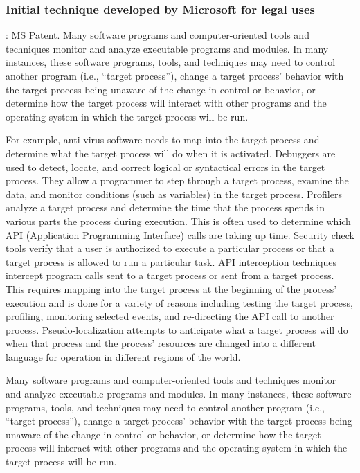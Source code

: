 \documentclass{article}
\begin{document}
\subsubsection{\textcite{Ghizzoni:2004} Initial technique developed by Microsoft for legal uses}
\textbf{}: MS Patent. Many software programs and computer-oriented tools and techniques monitor and analyze executable programs and modules. In many instances, these software programs, tools, and techniques may need to control another program (i.e., “target process”), change a target process' behavior with the target process being unaware of the change in control or behavior, or determine how the target process will interact with other programs and the operating system in which the target process will be run.

For example, anti-virus software needs to map into the target process and determine what the target process will do when it is activated. Debuggers are used to detect, locate, and correct logical or syntactical errors in the target process. They allow a programmer to step through a target process, examine the data, and monitor conditions (such as variables) in the target process. Profilers analyze a target process and determine the time that the process spends in various parts the process during execution. This is often used to determine which API (Application Programming Interface) calls are taking up time. Security check tools verify that a user is authorized to execute a particular process or that a target process is allowed to run a particular task. API interception techniques intercept program calls sent to a target process or sent from a target process. This requires mapping into the target process at the beginning of the process' execution and is done for a variety of reasons including testing the target process, profiling, monitoring selected events, and re-directing the API call to another process. Pseudo-localization attempts to anticipate what a target process will do when that process and the process' resources are changed into a different language for operation in different regions of the world.

Many software programs and computer-oriented tools and techniques monitor and analyze executable programs and modules. In many instances, these software programs, tools, and techniques may need to control another program (i.e., “target process”), change a target process' behavior with the target process being unaware of the change in control or behavior, or determine how the target process will interact with other programs and the operating system in which the target process will be run.
\end{document}
